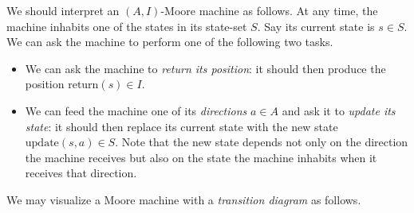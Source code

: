 \documentclass[Book-Poly]{subfiles}
\begin{document}
We should interpret an $(A,I)$-Moore machine as follows.
At any time, the machine inhabits one of the states in its state-set $S$.
Say its current state is $s\in S$.
We can ask the machine to perform one of the following two tasks.
\begin{itemize}
  \item We can ask the machine to \emph{return its position}: it should then produce the position $\text{return}(s) \in I$.
  \item We can feed the machine one of its \emph{directions} $a\in A$ and ask it to \emph{update its state}: it should then replace its current state with the new state $\text{update}(s,a)\in S$.
  Note that the new state depends not only on the direction the machine receives but also on the state the machine inhabits when it receives that direction.
\end{itemize}

We may visualize a Moore machine with a \emph{transition diagram} as follows.

\end{document}
